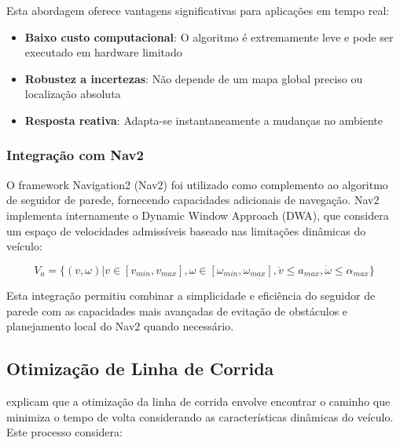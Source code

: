 Esta abordagem oferece vantagens significativas para aplicações em tempo real:

\begin{itemize}
    \item \textbf{Baixo custo computacional}: O algoritmo é extremamente leve e pode ser executado em hardware limitado
    \item \textbf{Robustez a incertezas}: Não depende de um mapa global preciso ou localização absoluta
    \item \textbf{Resposta reativa}: Adapta-se instantaneamente a mudanças no ambiente
\end{itemize}

\subsubsection{Integração com Nav2}

O framework Navigation2 (Nav2) foi utilizado como complemento ao algoritmo de
seguidor de parede, fornecendo capacidades adicionais de navegação. Nav2
implementa internamente o Dynamic Window Approach (DWA), que considera um
espaço de velocidades admissíveis baseado nas limitações dinâmicas do veículo:

\begin{equation}
    V_a = \{(v,\omega) | v \in [v_{min}, v_{max}], \omega \in [\omega_{min}, \omega_{max}], \ddot{v} \leq a_{max}, \dot{\omega} \leq \alpha_{max}\}
    \label{eq:dwa_velocity_space}
\end{equation}

Esta integração permitiu combinar a simplicidade e eficiência do seguidor de
parede com as capacidades mais avançadas de evitação de obstáculos e
planejamento local do Nav2 quando necessário.

\subsection{Otimização de Linha de Corrida}

\cite{OKelly2020F1TENTH} explicam que a otimização da linha de corrida envolve encontrar o caminho que minimiza o tempo de volta considerando as características dinâmicas do veículo. Este processo considera:

